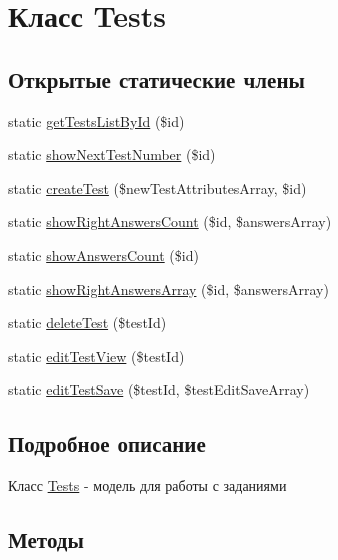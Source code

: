 \hypertarget{classTests}{}\section{Класс Tests}
\label{classTests}
\subsection*{Открытые статические члены}
\begin{DoxyCompactItemize}
\item 
static \hyperlink{classTests_a58718cca1a41aad3d387b3d2dfe13db5}{get\+Tests\+List\+By\+Id} (\$id)
\item 
static \hyperlink{classTests_acde72a5417f95e2d3988cc100dce5565}{show\+Next\+Test\+Number} (\$id)
\item 
static \hyperlink{classTests_ab65569bad267b78f48d6e3b8f55a5790}{create\+Test} (\$new\+Test\+Attributes\+Array, \$id)
\item 
static \hyperlink{classTests_aa8948ae45ba690492267a363b154f27a}{show\+Right\+Answers\+Count} (\$id, \$answers\+Array)
\item 
static \hyperlink{classTests_ab55fb00a00c823f9e32ff137b145b993}{show\+Answers\+Count} (\$id)
\item 
static \hyperlink{classTests_a35ce304f555cb1d7e2a15deca43be444}{show\+Right\+Answers\+Array} (\$id, \$answers\+Array)
\item 
static \hyperlink{classTests_aa96ce8b0f07a2f93e6440d07f60aac18}{delete\+Test} (\$test\+Id)
\item 
static \hyperlink{classTests_ac39dccfaa4c72e4cd4797492726a8ed4}{edit\+Test\+View} (\$test\+Id)
\item 
static \hyperlink{classTests_a51bde5ab01ece0ad78754806e30c5924}{edit\+Test\+Save} (\$test\+Id, \$test\+Edit\+Save\+Array)
\end{DoxyCompactItemize}


\subsection{Подробное описание}
Класс \hyperlink{classTests}{Tests} -\/ модель для работы с заданиями 

\subsection{Методы}
